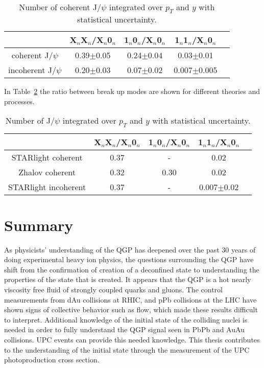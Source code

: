     \begin{table}[h]
      \begin{center}
        \begin{tabular}{|c|c|c|c|c|}
          \hline
          & X$_{n}$X$_{n}$/X$_{n}$0$_{n}$ & 1$_{n}$0$_{n}$/X$_{n}$0$_{n}$ & 1$_{n}$1$_{n}$/X$_{n}$0$_{n}$  \\ \hline
          coherent J/$\psi$ &  0.39$\pm$0.05&0.24$\pm$0.04&0.03$\pm$0.01\\ \hline
          incoherent J/$\psi$ &  0.20$\pm$0.03&0.07$\pm$0.02&0.007$\pm$0.005 \\ \hline
        \end{tabular}
      \caption{\label{tab:r2} Number of coherent J/$\psi$ integrated over $p_{T}$ and $y$ 
        with statistical uncertainty.}
      \end{center}
    \end{table}

    In Table~\ref{tab:r3} the ratio between break up modes are shown for 
      different theories and processes.
    \begin{table}[h]
      \begin{center}
        \begin{tabular}{|c|c|c|c|c|}
          \hline
          & X$_{n}$X$_{n}$/X$_{n}$0$_{n}$ & 1$_{n}$0$_{n}$/X$_{n}$0$_{n}$ & 1$_{n}$1$_{n}$/X$_{n}$0$_{n}$  \\ \hline
          STARlight coherent &  0.37&-&0.02\\ \hline
          Zhalov coherent& 0.32&0.30&0.02\\ \hline
          STARlight incoherent &  0.37&-&0.007$\pm$0.02 \\ \hline
        \end{tabular}
        \caption{\label{tab:r3} Number of  J/$\psi$ integrated over $p_{T}$ and $y$ with 
          statistical uncertainty.}
      \end{center}
    \end{table}

  \section{\label{sec:summary}Summary}
    As physicists' understanding of the QGP has deepened over the past 30 years
      of doing experimental heavy ion physics, the questions surrounding the
      QGP have shift from the confirmation of creation of a deconfined state
      to understanding the properties of the state that is created.
    It appears that the QGP is a hot nearly viscosity free fluid of strongly 
      coupled quarks and gluons. 
    The control measurements from dAu collisions at RHIC, and pPb collisions
      at the LHC have shown signs of collective behavior such as flow, which 
      made these results difficult to interpret.
    Additional knowledge of the initial state of the colliding nuclei is needed
      in order to fully understand the QGP signal seen in PbPb and AuAu 
      collisions.
    UPC events can provide this needed knowledge. 
    This thesis contributes to the understanding of the initial state through
      the measurement of the UPC \JPsi{} photoproduction cross section. 
  
